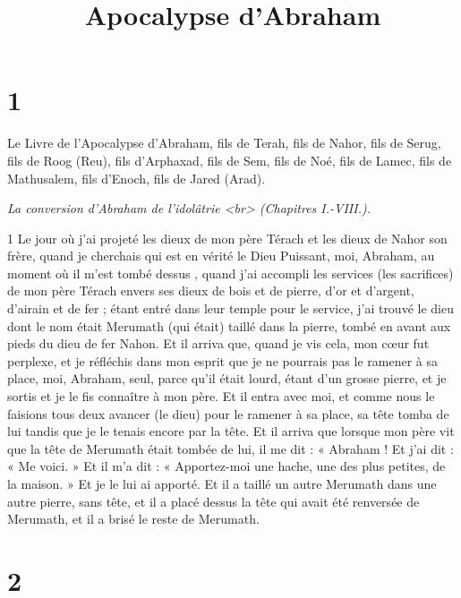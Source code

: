 

\title{Apocalypse d'Abraham}

\chapter{1}

\par Le Livre de l'Apocalypse d'Abraham, fils de Terah, fils de Nahor, fils de Serug, fils de Roog (Reu), fils d'Arphaxad, fils de Sem, fils de Noé, fils de Lamec, fils de Mathusalem, fils d'Enoch, fils de Jared (Arad).

\par \textit{La conversion d'Abraham de l'idolâtrie <br> (Chapitres I.-VIII.).}

\par 1 Le jour où j'ai projeté les dieux de mon père Térach et les dieux de Nahor son frère, quand je cherchais qui est en vérité le Dieu Puissant, moi, Abraham, au moment où il m'est tombé dessus , quand j'ai accompli les services (les sacrifices) de mon père Térach envers ses dieux de bois et de pierre, d'or et d'argent, d'airain et de fer ; étant entré dans leur temple pour le service, j'ai trouvé le dieu dont le nom était Merumath (qui était) taillé dans la pierre, tombé en avant aux pieds du dieu de fer Nahon. Et il arriva que, quand je vis cela, mon cœur fut perplexe, et je réfléchis dans mon esprit que je ne pourrais pas le ramener à sa place, moi, Abraham, seul, parce qu'il était lourd, étant d'un grosse pierre, et je sortis et je le fis connaître à mon père. Et il entra avec moi, et comme nous le faisions tous deux avancer (le dieu) pour le ramener à sa place, sa tête tomba de lui tandis que je le tenais encore par la tête. Et il arriva que lorsque mon père vit que la tête de Merumath était tombée de lui, il me dit : « Abraham ! Et j’ai dit : « Me voici. » Et il m’a dit : « Apportez-moi une hache, une des plus petites, de la maison. » Et je le lui ai apporté. Et il a taillé un autre Merumath dans une autre pierre, sans tête, et il a placé dessus la tête qui avait été renversée de Merumath, et il a brisé le reste de Merumath.

\chapter{2}

